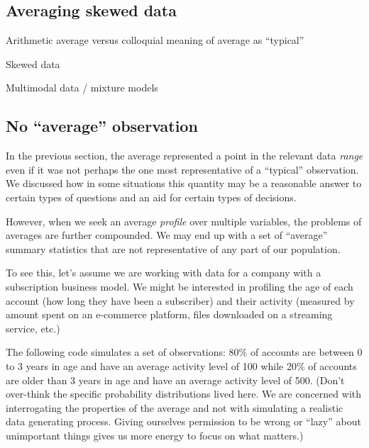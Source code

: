 \documentclass[
]{krantz}
\begin{document}
\hypertarget{averaging-skewed-data}{%
\subsection{Averaging skewed data}\label{averaging-skewed-data}}

Arithmetic average versus colloquial meaning of average as ``typical''

Skewed data

Multimodal data / mixture models

\hypertarget{no-average-observation}{%
\subsection{No ``average'' observation}\label{no-average-observation}}

In the previous section, the average represented a point in the relevant data \emph{range} even if it was not perhaps the one most representative of a ``typical'' observation.
We discussed how in some situations this quantity may be a reasonable answer to certain types of questions and an aid for certain types of decisions.

However, when we seek an average \emph{profile} over multiple variables, the problems of averages are further compounded.
We may end up with a set of ``average'' summary statistics that are not representative of any part of our population.

To see this, let's assume we are working with data for a company with a subscription business model.
We might be interested in profiling the age of each account (how long they have been a subscriber) and their activity (measured by amount spent on an e-commerce platform, files downloaded on a streaming service, etc.)

The following code simulates a set of observations:
80\% of accounts are between 0 to 3 years in age and have an average activity level of 100 while 20\% of accounts are older than 3 years in age and have an average activity level of 500.
(Don't over-think the specific probability distributions lived here.
We are concerned with interrogating the properties of the average and not with simulating a realistic data generating process.
Giving ourselves permission to be wrong or ``lazy'' about unimportant things gives us more energy to focus on what matters.)
\end{document}
